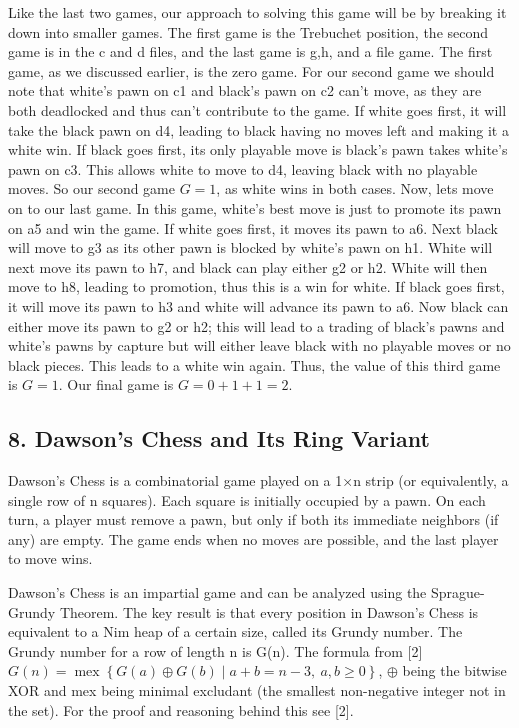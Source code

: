 \documentclass{article}
\begin{document}
\indent Like the last two games, our approach to solving this game will be by breaking it down into smaller games. The first game is the Trebuchet position, the second game is in the c and d files, and the last game is g,h, and a file game. The first game, as we discussed earlier, is the zero game. For our second game we should note that white's pawn on c1 and black's pawn on c2 can't move, as they are both deadlocked and thus can't contribute to the game. If white goes first, it will take the black pawn on d4, leading to black having no moves left and making it a white win. If black goes first, its only playable move is black's pawn takes white's pawn on c3. This allows white to move to d4, leaving black with no playable moves. So our second game $G = 1$, as white wins in both cases. Now, lets move on to our last game. In this game, white's best move is just to promote its pawn on a5 and win the game. If white goes first, it moves its pawn to a6. Next black will move to g3 as its other pawn is blocked by white's pawn on h1. White will next move its pawn to h7, and black can play either g2 or h2. White will then move to h8, leading to promotion, thus this is a win for white. If black goes first, it will move its pawn to h3 and white will advance its pawn to a6. Now black can either move its pawn to g2 or h2; this will lead to a trading of black's pawns and white's pawns by capture but will either leave black with no playable moves or no black pieces. This leads to a white win again. Thus, the value of this third game is $G=1$. Our final game is $G = 0+1+1 = 2$. 

\begin{center}
\item \section*{8. Dawson's Chess and Its Ring Variant}
\end{center}

\indent Dawson's Chess is a combinatorial game played on a 1×n strip (or equivalently, a single row of n squares). Each square is initially occupied by a pawn. On each turn, a player must remove a pawn, but only if both its immediate neighbors (if any) are empty. The game ends when no moves are possible, and the last player to move wins. 
\vspace{0.5em}

\indent Dawson's Chess is an impartial game and can be analyzed using the Sprague-Grundy Theorem. The key result is that every position in Dawson's Chess is equivalent to a Nim heap of a certain size, called its Grundy number. The Grundy number for a row of length n is G(n). The formula from [2] $G(n) = \operatorname{mex} \left\{ G(a) \oplus G(b) \mid a + b = n - 3,\ a, b \geq 0 \right\}$, $\oplus$ being the bitwise XOR and mex being minimal excludant (the smallest non-negative integer not in the set). For the proof and reasoning behind this see [2]. 
\vspace{0.5em}
\end{document}
